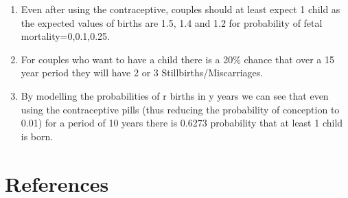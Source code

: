 \documentclass{article}
\begin{document}
\begin{enumerate}
\item Even after using the contraceptive, couples should at least expect 1 child as the expected values of births are 1.5, 1.4 and 1.2 for probability of fetal mortality=0,0.1,0.25.
\item For couples who want to have a child there is a 20\% chance that over a 15 year period they will have 2 or 3 Stillbirths/Miscarriages.
\item By modelling the probabilities of r births in y years we can see that even using the contraceptive pills (thus reducing the probability of conception to 0.01) for a period of 10 years there is 0.6273 probability that at least 1 child is born.
\end{enumerate} 

\section{References}




\end{document}
